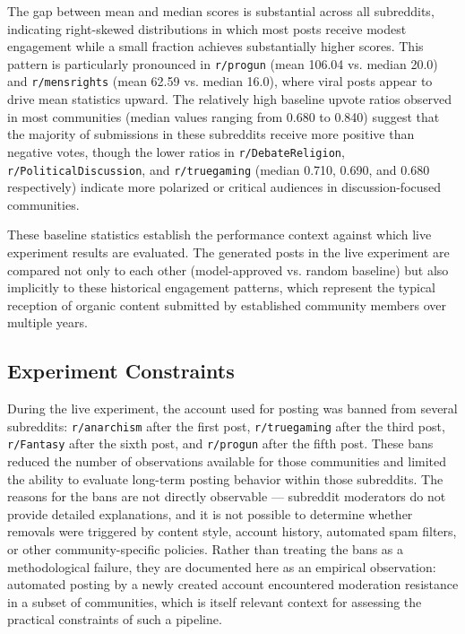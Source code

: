 The gap between mean and median scores is substantial across all subreddits, indicating right-skewed distributions in which most posts receive modest engagement while a small fraction achieves substantially higher scores. This pattern is particularly pronounced in \verb!r/progun! (mean 106.04 vs. median 20.0) and \verb!r/mensrights! (mean 62.59 vs. median 16.0), where viral posts appear to drive mean statistics upward. The relatively high baseline upvote ratios observed in most communities (median values ranging from 0.680 to 0.840) suggest that the majority of submissions in these subreddits receive more positive than negative votes, though the lower ratios in \verb!r/DebateReligion!, \verb!r/PoliticalDiscussion!, and \verb!r/truegaming! (median 0.710, 0.690, and 0.680 respectively) indicate more polarized or critical audiences in discussion-focused communities.

These baseline statistics establish the performance context against which live experiment results are evaluated. The generated posts in the live experiment are compared not only to each other (model-approved vs. random baseline) but also implicitly to these historical engagement patterns, which represent the typical reception of organic content submitted by established community members over multiple years.

\subsection{Experiment Constraints}

During the live experiment, the account used for posting was banned from several subreddits: \verb!r/anarchism! after the first post, \verb!r/truegaming! after the third post, \verb!r/Fantasy! after the sixth post, and \verb!r/progun! after the fifth post. These bans reduced the number of observations available for those communities and limited the ability to evaluate long-term posting behavior within those subreddits. The reasons for the bans are not directly observable — subreddit moderators do not provide detailed explanations, and it is not possible to determine whether removals were triggered by content style, account history, automated spam filters, or other community-specific policies. Rather than treating the bans as a methodological failure, they are documented here as an empirical observation: automated posting by a newly created account encountered moderation resistance in a subset of communities, which is itself relevant context for assessing the practical constraints of such a pipeline.

